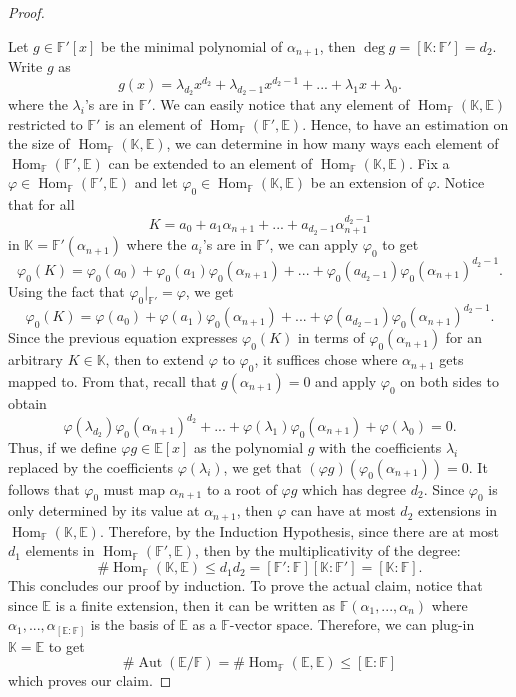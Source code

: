 \documentclass{article}
\newcommand{\F}{\mathbb{F}}
\newcommand{\E}{\mathbb{E}}
\newcommand{\K}{\mathbb{K}}
\DeclareMathOperator{\Aut}{\text{Aut}}
\DeclareMathOperator{\Hom}{\text{Hom}}
\begin{document}
\begin{proof}
\begin{center}
    \end{center}
    Let $g \in \F'[x]$ be the minimal polynomial of $\alpha_{n+1}$, then $\deg g = [\K : \F'] = d_2$. Write $g$ as
    $$g(x) = \lambda_{d_2}x^{d_2} + \lambda_{d_2 - 1}x^{d_2 - 1} + ... + \lambda_1 x + \lambda_0.$$
    where the $\lambda_i$'s are in $\F'$. We can easily notice that any element of $\Hom_{\F}(\K, \E)$ restricted to $\F'$ is an element of $\Hom_{\F}(\F', \E)$. Hence, to have an estimation on the size of $\Hom_{\F}(\K, \E)$, we can determine in how many ways each element of $\Hom_{\F}(\F', \E)$ can be extended to an element of $\Hom_{\F}(\K, \E)$. Fix a $\varphi \in \Hom_{\F}(\F', \E)$ and let $\varphi_0 \in \Hom_{\F}(\K, \E)$ be an extension of $\varphi$. Notice that for all
    $$K = a_0 + a_1 \alpha_{n+1} + ... + a_{d_2 - 1}\alpha_{n+1}^{d_2 - 1}$$
    in $\K = \F'(\alpha_{n+1})$ where the $a_i$'s are in $\F'$, we can apply $\varphi_0$ to get
    $$\varphi_0(K) = \varphi_0(a_0) + \varphi_0(a_1) \varphi_0(\alpha_{n+1}) + ... + \varphi_0(a_{d_2 - 1}) \varphi_0(\alpha_{n+1})^{d_2 - 1}.$$
    Using the fact that $\varphi_0|_{\F'} = \varphi$, we get
    $$\varphi_0(K) = \varphi(a_0) + \varphi(a_1) \varphi_0(\alpha_{n+1}) + ... + \varphi(a_{d_2 - 1}) \varphi_0(\alpha_{n+1})^{d_2 - 1}.$$
    Since the previous equation expresses $\varphi_0(K)$ in terms of $\varphi_0(\alpha_{n+1})$ for an arbitrary $K \in \K$, then to extend $\varphi$ to $\varphi_0$, it suffices chose where $\alpha_{n+1}$ gets mapped to. From that, recall that $g(\alpha_{n+1}) = 0$ and apply $\varphi_0$ on both sides to obtain
    $$\varphi(\lambda_{d_2})\varphi_0(\alpha_{n+1})^{d_2}  + ... + \varphi(\lambda_1) \varphi_0(\alpha_{n+1}) + \varphi(\lambda_0) = 0.$$
    Thus, if we define $\varphi g \in \E[x]$ as the polynomial $g$ with the coefficients $\lambda_i$ replaced by the coefficients $\varphi(\lambda_i)$, we get that $(\varphi g)(\varphi_0(\alpha_{n+1})) = 0$. It follows that $\varphi_0$ must map $\alpha_{n+1}$ to a root of $\varphi g$ which has degree $d_2$. Since $\varphi_0$ is only determined by its value at $\alpha_{n+1}$, then $\varphi$ can have at most $d_2$ extensions in $\Hom_{\F}(\K, \E)$. Therefore, by the Induction Hypothesis, since there are at most $d_1$ elements in $\Hom_{\F}(\F', \E)$, then by the multiplicativity of the degree:
    $$\#\Hom_{\F}(\K, \E) \leq d_1 d_2 = [\F': \F] [\K : \F'] = [\K : \F].$$
    This concludes our proof by induction. To prove the actual claim, notice that since $\E$ is a finite extension, then it can be written as $\F(\alpha_1, ..., \alpha_n)$ where $\alpha_1, ..., \alpha_{[\E : \F]}$ is the basis of $\E$ as a $\F$-vector space. Therefore, we can plug-in $\K = \E$ to get
    $$\# \Aut(\E / \F) = \# \Hom_{\F}(\E, \E) \leq [\E : \F]$$
    which proves our claim. 
\end{proof}
\end{document}
